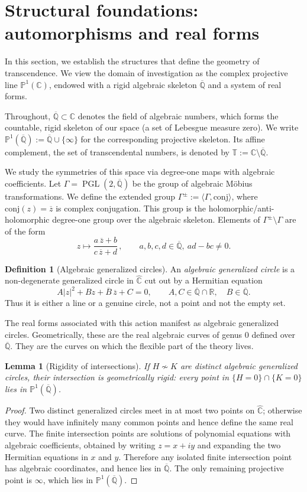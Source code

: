 \documentclass[11pt,a4paper]{article}
\theoremstyle{plain}
\newtheorem{lemma}[theorem]{Lemma}
\theoremstyle{definition}
\newtheorem{definition}[theorem]{Definition}
\newcommand{\R}{\mathbb{R}}
\newcommand{\rsphere}{\hat{\mathbb{C}}}
\newcommand{\Alg}{\overline{\mathbb{Q}}}
\newcommand{\PAlg}{\mathbb{P}^{1}(\Alg)}
\newcommand{\trans}{\mathbb{T}}
\newcommand{\Tc}{\trans}
\DeclareMathOperator{\PGL}{PGL}
\newcommand{\J}{\mathrm{conj}}
\begin{document}
\section{Structural foundations: automorphisms and real forms}\label{sec:defining-domain}
In this section, we establish the structures that define the geometry of transcendence. We view the domain of investigation as the complex projective line $\mathbb{P}^1(\mathbb{C})$, endowed with a rigid algebraic skeleton $\Alg$ and a system of real forms.

Throughout, $\Alg\subset\mathbb{C}$ denotes the field of algebraic numbers, which forms the countable, rigid skeleton of our space (a set of Lebesgue measure zero). We write $\PAlg:=\Alg\cup\{\infty\}$ for the corresponding projective skeleton. Its affine complement, the set of transcendental numbers, is denoted by $\Tc:=\mathbb{C}\setminus\Alg$.

We study the symmetries of this space via degree-one maps with algebraic coefficients. Let $\Gamma=\PGL(2,\Alg)$ be the group of algebraic M\"obius transformations. We define the extended group $\Gamma^{\pm}:=\langle \Gamma,\J\rangle$, where $\J(z)=\overline{z}$ is complex conjugation. This group is the holomorphic/anti-holomorphic degree-one group over the algebraic skeleton. Elements of $\Gamma^{\pm}\setminus\Gamma$ are of the form
\[
	z \longmapsto \frac{a\,\overline{z}+b}{c\,\overline{z}+d}\,,\qquad a,b,c,d\in\Alg,\ ad-bc\neq 0.
\]

\begin{definition}[Algebraic generalized circles]\label{def:alg-generalized-circle}
	An \emph{algebraic generalized circle} is a non-degenerate generalized circle in $\rsphere$ cut out by a Hermitian equation
	\[
		A|z|^2+Bz+\overline B\,\overline z+C=0,
		\qquad A,C\in\Alg\cap\R,\quad B\in\Alg.
	\]
	Thus it is either a line or a genuine circle, not a point and not the empty set.
\end{definition}

The real forms associated with this action manifest as algebraic generalized circles. Geometrically, these are the real algebraic curves of genus $0$ defined over $\Alg$. They are the curves on which the flexible part of the theory lives.

\begin{lemma}[Rigidity of intersections]\label{lem:alg-intersection}
	If $H\not\sim K$ are distinct algebraic generalized circles, their intersection is geometrically rigid: every point in $\{H=0\}\cap\{K=0\}$ lies in $\PAlg$.
\end{lemma}
\begin{proof}
	Two distinct generalized circles meet in at most two points on $\rsphere$; otherwise they would have infinitely many common points and hence define the same real curve. The finite intersection points are solutions of polynomial equations with algebraic coefficients, obtained by writing $z=x+iy$ and expanding the two Hermitian equations in $x$ and $y$. Therefore any isolated finite intersection point has algebraic coordinates, and hence lies in $\Alg$. The only remaining projective point is $\infty$, which lies in $\PAlg$.
\end{proof}
\end{document}
